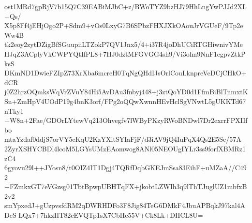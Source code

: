 ost1MRd7gpRjV7b15Q7C39EABiMJbC+z/BWoTYZ9bzHJ79HhLngYwPJJd2XL+Qs/
X5p8Ff4jEHjOgo2P+Sdm9+vOs0LxyG7B6SPbzFHXJXkOAouJrVGUeF/9Tp2eWw4B
tk2eoy2zytDZigBfSGuupiiLTZokP7QV1Jnx5/4+i37R4joDhUCiRTGHiwnivYMe
HJqZ3ACplyVkCWPYQtIfPL8+7HJ0dztMFGVGG4sh9/Vi3olm9NnF1egpvZtkPksS
DKmND1DwieFZIpZ73XrXba6mcreH0TqNgQHdIJsOrlCouLknpreVcDCjCHkO+dCR
j0Z2hrzOQmksWqVrZVuY84Hi5AvDAu3fnbyj448+j3ztQoYD0d1FfmBiBlTnmxtK
Sn+ZmHpV4UOdP19g4bnK3orf/FPg2oQQwXwnnHEvHclSgVNwtL5gUKKTd67nTky1
+W8n+2Fae/GDOrLYtewVq213Ohvegfv7lWByPKzyRWoBNDwl7Dr2exrrFPXIIfbo
mtaYzdaf0ddjS7orVY5eKqU2KzYXltSYIaFjF/d3iAV9jQ4IuPqX4Qs2E5Se/57A
2ZyrXSHYCBDl4lcoM5LGYsUMzEAomwog8ANl05NEOUgIYLr3ss9forfXBMRz1zC4
6gyovu29l++JYosn8/t0OIZ4IT1Dgj4TQRfDqbGKEJmSsa83EihF+uMZaA//C492
+FZmkxGT7eVGzsg01TbtBpwpUBHTqFX+jkobtLZWIh3q9lThTJuglUZ1mbfxB2v2
smYpxedJ+gUzpvsfdRM2qDWRHDFo3F8Jig84TeG6DMkF4JbuAPBqkJ97kal4ADeS
LQx7+7hkzHT82cEVQTp1sX7CbHc55V+Ck8Lk+DHCL8U=
